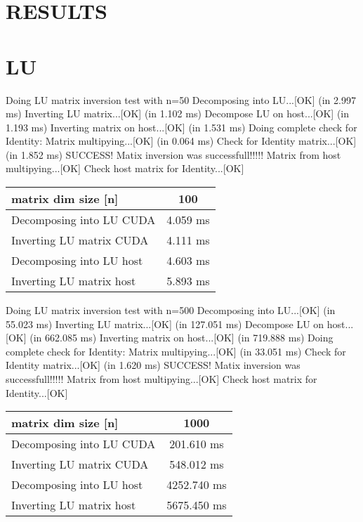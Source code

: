 
\section{RESULTS}\label{sec:results}
\section{LU}


Doing LU matrix inversion test with n=50
Decomposing into LU...[OK] (in 2.997 ms)
Inverting LU matrix...[OK] (in 1.102 ms)
Decompose LU on host...[OK] (in 1.193 ms)
Inverting matrix on host...[OK] (in 1.531 ms)
Doing complete check for Identity:
Matrix multipying...[OK] (in 0.064 ms)
Check for Identity matrix...[OK] (in 1.852 ms)
SUCCESS! Matix inversion was successfull!!!!!
Matrix from host multipying...[OK]
Check host matrix for Identity...[OK]


\begin{tabular}{|l|c|}
	\hline
	matrix dim size [n] & 100 \\
	\hline
	Decomposing into LU CUDA & 4.059 ms \\
	Inverting LU matrix CUDA & 4.111 ms \\
	\hline
	Decomposing into LU host & 4.603 ms \\
	Inverting LU matrix host & 5.893 ms \\		
	\hline
\end{tabular}


Doing LU matrix inversion test with n=500
Decomposing into LU...[OK] (in 55.023 ms)
Inverting LU matrix...[OK] (in 127.051 ms)
Decompose LU on host...[OK] (in 662.085 ms)
Inverting matrix on host...[OK] (in 719.888 ms)
Doing complete check for Identity:
Matrix multipying...[OK] (in 33.051 ms)
Check for Identity matrix...[OK] (in 1.620 ms)
SUCCESS! Matix inversion was successfull!!!!!
Matrix from host multipying...[OK]
Check host matrix for Identity...[OK]



\begin{tabular}{|l|c|}
	\hline
	matrix dim size [n] & 1000 \\
	\hline
	Decomposing into LU CUDA & 201.610  ms \\
	Inverting LU matrix CUDA & 548.012 ms \\
	\hline
	Decomposing into LU host & 4252.740 ms \\
	Inverting LU matrix host & 5675.450 ms \\		
	\hline
\end{tabular}

